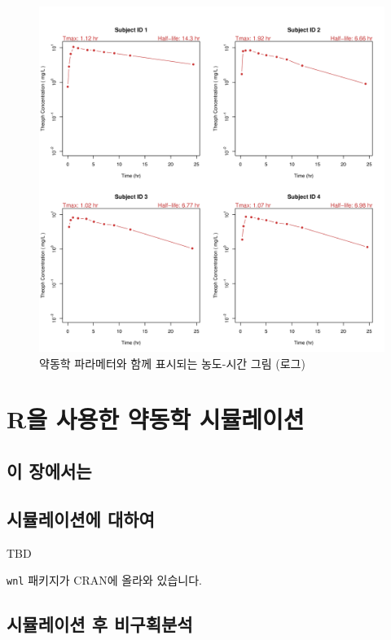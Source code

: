 \documentclass[12pt,]{krantz}
\theoremstyle{definition}
\theoremstyle{definition}
\theoremstyle{definition}
\theoremstyle{remark}
\begin{document}
\begin{figure}
\includegraphics[width=41.67in]{Output/Individual_PK_Log_10_Scale_for_Theoph00} \caption{약동학 파라메터와 함께 표시되는 농도-시간 그림 (로그)}\label{fig:unnamed-chunk-23}
\end{figure}

\chapter{R을 사용한 약동학 시뮬레이션}\label{simulation}

\section{이 장에서는}\label{summary-simulation}

\section{시뮬레이션에 대하여}\label{-}

TBD

\texttt{wnl} 패키지가 CRAN에 올라와 있습니다.

\section{시뮬레이션 후 비구획분석}\label{--}
\end{document}
